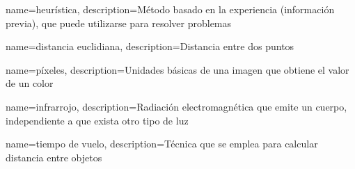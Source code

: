  {
 name={heur\'istica},
 description={M\'etodo basado en la experiencia (informaci\'on previa), que puede utilizarse para resolver problemas }
 }

 {	
 name={distancia euclidiana},
 description={Distancia entre dos puntos}
 }
 
 
 {
 name={p\'ixeles},
 description={Unidades b\'asicas de una imagen que obtiene el valor de un color}
 }
 
 {
 name={infrarrojo},
 description={Radiaci\'on electromagn\'etica que emite un cuerpo, independiente a que exista otro tipo de luz}
 }
 
 {
 name={tiempo de vuelo},
 description={T\'ecnica que se emplea para calcular distancia entre objetos}
 }